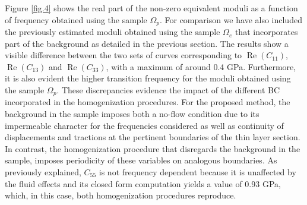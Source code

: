 \documentclass[draft]{agujournal2019}
\renewcommand{\Re}{\operatorname{Re} }
\begin{document}
Figure \ref{fig.4} shows the real part of the non-zero equivalent moduli as a function of frequency obtained using the sample $\Omega_p$. For comparison we have also included the previously estimated moduli obtained using the sample $\Omega_e$ that incorporates part of the background as detailed in the previous section. The results show  a visible difference between the two sets of curves corresponding to $\Re(C_{11})$, $\Re(C_{13})$ and $\Re(C_{33})$, with a maximum of around 0.4 GPa. Furthermore, it is also evident the higher transition frequency for the moduli obtained using the sample $\Omega_p$. These discrepancies evidence the impact of the different BC incorporated in the homogenization procedures. For the proposed method, the  background in the sample imposes both a no-flow condition due to its impermeable character for the frequencies considered as well as continuity of displacements and tractions at the pertinent boundaries of the thin layer section. In contrast, the  homogenization procedure that disregards the background in the sample, imposes periodicity of these variables on analogous boundaries. 
As previously explained, $C_{55}$ is not frequency dependent because it is unaffected by the fluid effects and its closed form computation yields a value of 0.93 GPa, which, in this case, both homogenization procedures reproduce.
\end{document}
